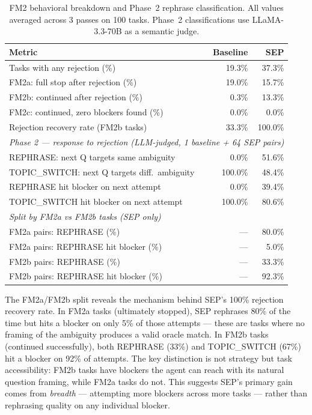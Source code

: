 \documentclass{article} %
\newcommand{\oursystem}{SEP} %
\begin{document}
\begin{table}[h]
\caption{FM2 behavioral breakdown and Phase~2 rephrase classification.
All values averaged across 3 passes on 100 tasks.
Phase~2 classifications use LLaMA-3.3-70B as a semantic judge.}
\label{tab:fm2_deep}
\begin{center}
\small
\begin{tabular}{p{5.8cm}rr}
\toprule
\textbf{Metric} & \textbf{Baseline} & \textbf{SEP} \\
\midrule
Tasks with any rejection (\%)             & 19.3\% & 37.3\% \\
FM2a: full stop after rejection (\%)      & 19.0\% & 15.7\% \\
FM2b: continued after rejection (\%)      &  0.3\% & 13.3\% \\
FM2c: continued, zero blockers found (\%) &  0.0\% &  0.0\% \\
Rejection recovery rate (FM2b tasks)      & 33.3\% & 100.0\% \\
\midrule
\multicolumn{3}{l}{\textit{Phase 2 --- response to rejection (LLM-judged, 1 baseline + 64 SEP pairs)}} \\
\midrule
REPHRASE: next Q targets same ambiguity        &  0.0\% & 51.6\% \\
TOPIC\_SWITCH: next Q targets diff.\ ambiguity & 100.0\% & 48.4\% \\
\quad REPHRASE hit blocker on next attempt     &  0.0\% & 39.4\% \\
\quad TOPIC\_SWITCH hit blocker on next attempt & 100.0\% & 80.6\% \\
\midrule
\multicolumn{3}{l}{\textit{Split by FM2a vs FM2b tasks (SEP only)}} \\
\midrule
FM2a pairs: REPHRASE (\%)              & --- & 80.0\% \\
FM2a pairs: REPHRASE hit blocker (\%)  & --- &  5.0\% \\
FM2b pairs: REPHRASE (\%)              & --- & 33.3\% \\
FM2b pairs: REPHRASE hit blocker (\%)  & --- & 92.3\% \\
\bottomrule
\end{tabular}
\end{center}
\end{table}

The FM2a/FM2b split reveals the mechanism behind \oursystem{}'s 100\% rejection
recovery rate.
In FM2a tasks (ultimately stopped), \oursystem{} rephrases 80\% of the time but hits a
blocker on only 5\% of those attempts --- these are tasks where no framing of the
ambiguity produces a valid oracle match.
In FM2b tasks (continued successfully), both REPHRASE (33\%) and TOPIC\_SWITCH (67\%)
hit a blocker on 92\% of attempts.
The key distinction is not strategy but task accessibility: FM2b tasks have blockers
the agent can reach with its natural question framing, while FM2a tasks do not.
This suggests \oursystem{}'s primary gain comes from \emph{breadth} --- attempting
more blockers across more tasks --- rather than rephrasing quality on any individual
blocker.
\end{document}
